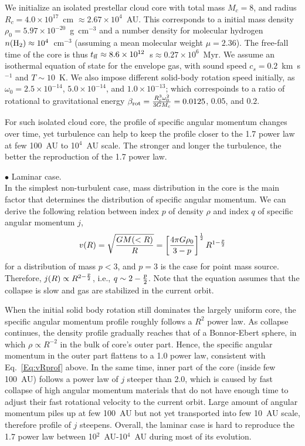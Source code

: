 We initialize an isolated prestellar cloud core with total mass
$M_c=8$\msun, and radius $R_c=4.0 \times 10^{17}$~cm
$\approx 2.67 \times 10^4$~AU. This corresponds to a initial mass density
$\rho_0=5.97 \times 10^{-20}$~g~cm$^{-3}$ and a number density for molecular
hydrogen $n({\rm H}_2) \approx 10^4$~cm$^{-3}$ (assuming a mean molecular
weight $\mu=2.36$). The free-fall time of the core is thus
$t_{\rm ff} \approx 8.6 \times 10^{12}$~s$\approx 0.27 \times 10^6$~Myr.
We assume an isothermal equation of state for the envelope gas, with
sound speed $c_s=0.2$~km~s$^{-1}$ and $T \sim 10$~K. We also impose different
solid-body rotation speed initially, as $\omega_0=2.5 \times 10^{-14}$,
$5.0 \times 10^{-14}$, and $1.0 \times 10^{-13}$; which correspoinds to
a ratio of rotational to gravitational energy
$\beta_{\rm rot}={R_c^3 \omega_0^2 \over 3 G M_c} = 0.0125$, $0.05$, and
$0.2$.

For such isolated cloud core, the profile of specific angular momentum
changes over time, yet turbulence can help to keep the profile
closer to the 1.7 power law at few 100~AU to 10$^4$~AU scale.
The stronger and longer the turbulence,
the better the reproduction of the 1.7 power law.

\noindent $\bullet$ Laminar case.\\
In the simplest non-turbulent case, mass distribution in the core is the main 
factor that determines the distribution of specific angular momentum. 
We can derive the following relation between index $p$ of density $\rho$ and 
index $q$ of specific angular momentum $j$, 
\begin{equation}
\label{Eq:vRprof}
v(R)=\sqrt{G M(<R) \over R}=\left[{ 4 \pi G \rho_0 \over 3-p}\right]^{1 \over 2
} R^{1-{p \over 2}}
\end{equation}
for a distribution of mass $p<3$, and $p=3$ is the case for point mass source.
Therefore, $j(R) \propto R^{2-{p \over 2}}$, i.e., $q \sim 2-{p \over2 }$. 
Note that the equation assumes that the collapse is slow and gas are stabilized 
in the current orbit.

When the initial solid body rotation still dominates the largely uniform core,
the specific angular momentum profile roughly follows a $R^2$ power law.
As collapse continues, the density profile gradually reaches
that of a Bonnor-Ebert sphere, in which $\rho \propto R^{-2}$
in the bulk of core's outer part.
Hence, the specific angular momentum in the outer part flattens to
a 1.0 power law, consistent with Eq.~\ref{Eq:vRprof} above. In the same
time, inner part of the core (inside few 100~AU) follows a power law of
$j$ steeper than 2.0, which is caused by fast collapse of high angular momentum
materials that do not have enough time to adjust their fast
rotational velocity to the current orbit. Large amount of angular
momentum piles up at few 100~AU but not yet transported into few 10~AU scale,
therefore profile of $j$ steepens. Overall, the laminar case is hard
to reproduce the 1.7 power law between
10$^2$~AU-10$^4$~AU during most of its evolution.

